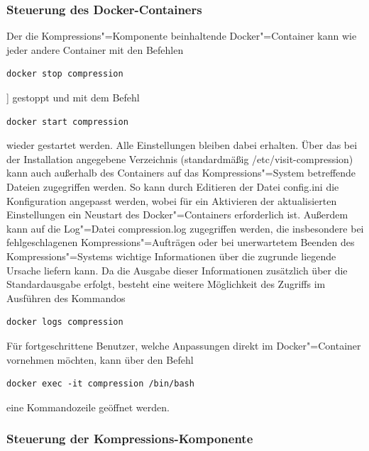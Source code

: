 \subsubsection{Steuerung des Docker-Containers}

Der die Kompressions"=Komponente beinhaltende Docker"=Container kann wie jeder andere Container mit den Befehlen
\begin{lstlisting}[caption={Kommando zum Beenden des Docker-Containers der Kompressions-Komponente},label=schlenke:lst:dockerstop]
docker stop compression
\end{lstlisting}]
gestoppt und mit dem Befehl
\begin{lstlisting}[caption={Kommando zum Starten des Docker-Containers der Kompressions-Komponente}]
docker start compression
\end{lstlisting}
wieder gestartet werden. Alle Einstellungen bleiben dabei erhalten. Über das bei der Installation angegebene Verzeichnis (standardmäßig {\ttfamily /etc/visit-compression}) kann auch außerhalb des Containers auf das Kompressions"=System betreffende Dateien zugegriffen werden. So kann durch Editieren der Datei {\ttfamily config.ini} die Konfiguration angepasst werden, wobei für ein Aktivieren der aktualisierten Einstellungen ein Neustart des Docker"=Containers erforderlich ist. Außerdem kann auf die Log"=Datei {compression.log} zugegriffen werden, die insbesondere bei fehlgeschlagenen Kompressions"=Aufträgen oder bei unerwartetem Beenden des Kompressions"=Systems wichtige Informationen über die zugrunde liegende Ursache liefern kann. Da die Ausgabe dieser Informationen zusätzlich über die Standardausgabe erfolgt, besteht eine weitere Möglichkeit des Zugriffs im Ausführen des Kommandos
\begin{lstlisting}[caption={Kommando zum Anzeigen der Ausgaben des Kompressions-Systems}]
docker logs compression
\end{lstlisting}
Für fortgeschrittene Benutzer, welche Anpassungen direkt im Docker"=Container vornehmen möchten, kann über den Befehl
\begin{lstlisting}[caption={Befehl zum Öffnen einer Kommandozeile im Kompressions-Container}]
docker exec -it compression /bin/bash
\end{lstlisting}
eine Kommandozeile geöffnet werden.

\subsubsection{Steuerung der Kompressions-Komponente}

